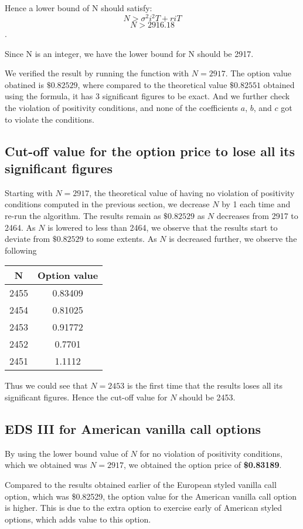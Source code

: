 Hence a lower bound of N should satisfy: $$N > \sigma^2 i^2 T + r i T$$ $$N > 2916.18$$. 

Since N is an integer, we have the lower bound for N should be 2917.

We verified the result by running the function with $N = 2917$. The option value obatined is $\$0.82529$, where compared to the theoretical value $\$0.82551$ obtained using the formula, it has 3 significant figures to be exact. And we further check the violation of positivity conditions, and none of the coefficients $a$, $b$, and $c$ got to violate the conditions.

\subsection{Cut-off value for the option price to lose all its significant figures}

Starting with $N = 2917$, the theoretical value of having no violation of positivity conditions computed in the previous section, we decrease $N$ by 1 each time and re-run the algorithm. The results remain as $\$0.82529$ as $N$ decreases from 2917 to 2464. As $N$ is lowered to less than 2464, we observe that the results start to deviate from $\$0.82529$ to some extents. As $N$ is decreased further, we observe the following
\begin{center}
	\begin{tabular}{| c | c |}
		\hline N & Option value\\
		[0.5ex]
		\hline 2455 & 0.83409 \\
		\hline 2454 & 0.81025 \\
		\hline 2453 & 0.91772 \\
		\hline 2452 & 0.7701 \\
		\hline 2451 & 1.1112 \\
		\hline
	\end{tabular}
\end{center}

Thus we could see that $N = 2453$ is the first time that the results loses all its significant figures. Hence the cut-off value for $N$ should be 2453.

\subsection{EDS III for American vanilla call options}
By using the lower bound value of $N$ for no violation of positivity conditions, which we obtained was $N = 2917$, we obtained the option price of \textbf{\$0.83189}.

Compared to the results obtained earlier of the European styled vanilla call option, which was \$0.82529, the option value for the American vanilla call option is higher. This is due to the extra option to exercise early of American styled options, which adds value to this option.

